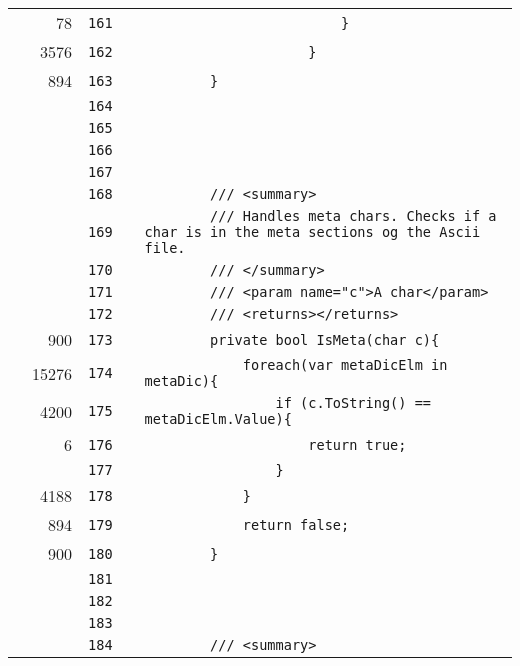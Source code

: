 \documentclass[a4paper,landscape,10pt]{article}
\begin{document}
\begin{longtable}[l]{lrrll}
\cellcolor{green} & 78 & \verb~161~ & & \verb~                        }~\\
\cellcolor{green} & 3576 & \verb~162~ & & \verb~                    }~\\
\cellcolor{green} & 894 & \verb~163~ & & \verb~        }~\\
\cellcolor{gray} &  & \verb~164~ & & \verb~~\\
\cellcolor{gray} &  & \verb~165~ & & \verb~~\\
\cellcolor{gray} &  & \verb~166~ & & \verb~~\\
\cellcolor{gray} &  & \verb~167~ & & \verb~~\\
\cellcolor{gray} &  & \verb~168~ & & \verb~        /// <summary>~\\
\cellcolor{gray} &  & \verb~169~ & & \verb~        /// Handles meta chars. Checks if a char is in the meta sections og the Ascii file.~\\
\cellcolor{gray} &  & \verb~170~ & & \verb~        /// </summary>~\\
\cellcolor{gray} &  & \verb~171~ & & \verb~        /// <param name="c">A char</param>~\\
\cellcolor{gray} &  & \verb~172~ & & \verb~        /// <returns></returns>~\\
\cellcolor{green} & 900 & \verb~173~ & & \verb~        private bool IsMeta(char c){~\\
\cellcolor{green} & 15276 & \verb~174~ & & \verb~            foreach(var metaDicElm in metaDic){~\\
\cellcolor{green} & 4200 & \verb~175~ & & \verb~                if (c.ToString() == metaDicElm.Value){~\\
\cellcolor{green} & 6 & \verb~176~ & & \verb~                    return true;~\\
\cellcolor{gray} &  & \verb~177~ & & \verb~                }~\\
\cellcolor{green} & 4188 & \verb~178~ & & \verb~            }~\\
\cellcolor{green} & 894 & \verb~179~ & & \verb~            return false;~\\
\cellcolor{green} & 900 & \verb~180~ & & \verb~        }~\\
\cellcolor{gray} &  & \verb~181~ & & \verb~~\\
\cellcolor{gray} &  & \verb~182~ & & \verb~~\\
\cellcolor{gray} &  & \verb~183~ & & \verb~~\\
\cellcolor{gray} &  & \verb~184~ & & \verb~        /// <summary>~\\

\end{longtable}
\end{document}

